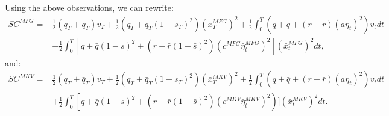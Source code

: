 \documentclass[11pt]{article}
\begin{document}
Using the above observations, we can rewrite:
\begin{equation}
\begin{split}
    SC^{MFG}=&\frac{1}{2}(q_T+\bar{q}_T)v_T+\frac{1}{2}\left(q_T+\bar{q}_T(1-s_T)^2\right)(\bar{x}_T^{MFG})^2+\frac{1}{2}\int_0^T (q+\bar{q}+(r+\bar{r})(a\eta_t)^2)v_tdt\\
    &+\frac{1}{2}\int_0^T\left[q+\bar{q}(1-s)^2+(r+\bar{r}(1-\bar{s})^2)(c^{MFG}\bar{\eta}_t^{MFG})^2\right](\bar{x}_t^{MFG})^2dt,
\end{split}
\label{eq:SC_MFG_1}
\end{equation}
and:
\begin{equation}
\begin{split}
    SC^{MKV}=&\frac{1}{2}(q_T+\bar{q}_T)v_T+\frac{1}{2}\left(q_T+\bar{q}_T(1-s_T)^2\right)(\bar{x}_T^{MKV})^2+ \frac{1}{2}\int_0^T (q+\bar{q}+(r+\bar{r})(a\eta_t)^2)v_tdt \\
    &+\frac{1}{2}\int_0^T\left[q+\bar{q}(1-s)^2+(r+\bar{r}(1-\bar{s})^2)(c^{MKV}\bar{\eta}_t^{MKV})^2\right)](\bar{x}_t^{MKV})^2dt.
\end{split}
\label{eq:SC_MKV_1}
\end{equation}
\end{document}
